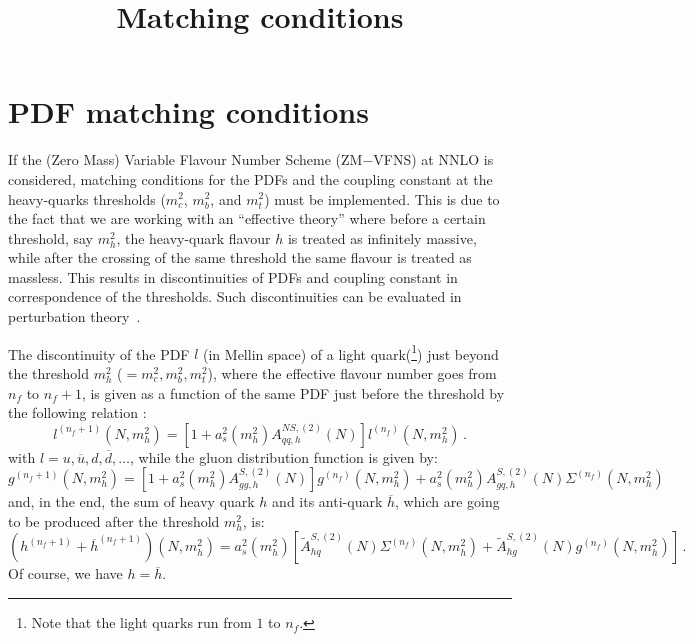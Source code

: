 \documentclass[10pt,a4paper]{article}
\begin{document}
\title{Matching conditions}

\tableofcontents
\newpage

\section{PDF matching conditions}

If the (Zero Mass) Variable Flavour Number Scheme (ZM$-$VFNS) at NNLO
is considered, matching conditions for the PDFs and the coupling
constant at the heavy-quarks thresholds ($m_c^2$, $m_b^2$, and $m_t^2$)
must be implemented. This is due to the fact that we are working with
an ``effective theory'' where before a certain threshold, say $m_h^2$,
the heavy-quark flavour $h$ is treated as infinitely massive, while
after the crossing of the same threshold the same flavour is treated
as massless. This results in discontinuities of PDFs and coupling
constant in correspondence of the thresholds. Such discontinuities can
be evaluated in perturbation theory~\cite{Buza:1996wv}.

The discontinuity of the PDF $l$ (in Mellin space) of a light
quark(\footnote{Note that the light quarks run from $1$ to $n_f$.})
just beyond the threshold $m_h^2$ ($=m_c^2,m_b^2,m_t^2$), where the
effective flavour number goes from $n_f$ to $n_f+1$, is given as a
function of the same PDF just before the threshold by the following
relation \cite{Vogt:2004ns}:
\begin{equation}
l^{(n_f+1)}(N,m_h^2)=[1+a_s^2(m_h^2)A_{qq,h}^{N\!S,(2)}(N)]l^{(n_f)}(N,m_h^2)\,.
\label{eq:lightqmc}
\end{equation}
with $l=u,\overline{u},d,\overline{d},\dots$, while the gluon
distribution function is given by:
\begin{equation}
\displaystyle
g^{(n_f+1)}(N,m_h^2)=[1+a_s^2(m_h^2)A_{gg,h}^{S,(2)}(N)]g^{(n_f)}(N,m_h^2)+a_s^2(m_h^2)A^{S,(2)}_{gq,h}(N)\Sigma^{(n_f)}(N,m^2_h)
\label{gluon}
\end{equation}
and, in the end, the sum of heavy quark $h$ and its anti-quark
$\overline{h}$, which are going to be produced after the threshold
$m_h^2$, is:
\begin{equation}
(h^{(n_f+1)}+\overline{h}^{(n_f+1)})(N,m_h^2)=a_s^2(m_h^2)[\tilde{A}^{S,(2)}_{hq}(N)\Sigma^{(n_f)}(N,m_h^2)+\tilde{A}^{S,(2)}_{hg}(N)g^{(n_f)}(N,m_h^2)]\,.
\label{eq:heavyqmc}
\end{equation}
Of course, we have $h=\overline{h}$. 
\end{document}
